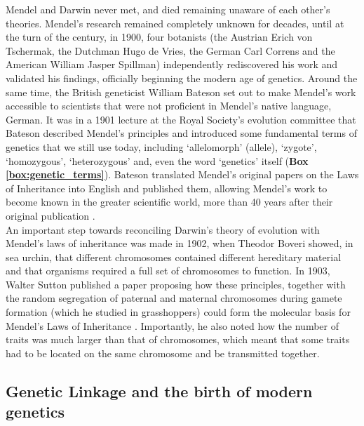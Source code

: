 Mendel and Darwin never met, and died remaining unaware of each other’s theories. 
Mendel’s research remained completely unknown for decades, until at the turn of the century, in 1900, four botanists (the Austrian Erich von Tschermak, the Dutchman Hugo de Vries, the German Carl Correns and the American William Jasper Spillman) independently rediscovered his work and validated his findings, officially beginning the modern age of genetics.
Around the same time, the British geneticist William Bateson set out to make Mendel’s work accessible to scientists that were not proficient in Mendel’s native language, German.
It was in a 1901 lecture at the Royal Society's evolution committee that Bateson described Mendel's principles and introduced some fundamental terms of genetics that we still use today, including `allelomorph' (allele), `zygote', `homozygous', `heterozygous' and, even the word `genetics' itself (\textbf{Box \ref{box:genetic_terms}}).
Bateson translated Mendel’s original papers on the Laws of Inheritance into English and published them, allowing Mendel’s work to become known in the greater scientific world, more than 40 years after their original publication \cite{bateson2013mendel}.\\ 

An important step towards reconciling Darwin’s theory of evolution with Mendel’s laws of inheritance was made in 1902, when Theodor Boveri showed, in sea urchin, that different chromosomes contained different hereditary material and that organisms required a full set of chromosomes to function. 
In 1903, Walter Sutton published a paper proposing how these principles, together with the random segregation of paternal and maternal chromosomes during gamete formation (which he studied in grasshoppers) could form the molecular basis for Mendel’s Laws of Inheritance \cite{sutton1903chromosomes}. 
Importantly, he also noted how the number of traits was much larger than that of chromosomes, which meant that some traits had to be located on the same chromosome and be transmitted together.

\subsection{Genetic Linkage and the birth of modern genetics} %
\label{sec:Morgan}

